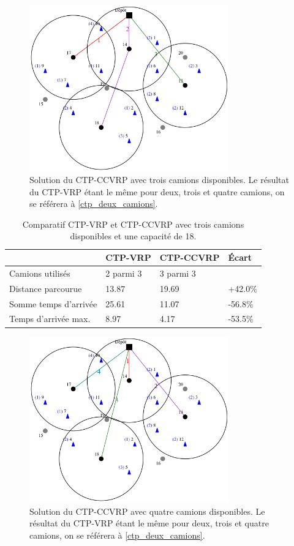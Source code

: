 \documentclass[5p,authoryear,square]{elsarticle}
\begin{document}
\begin{figure}[p] \centering
	\centerline{\includegraphics[width=3.4in]{figures/ctpccvrp_trois_camions}}
	\caption[]{Solution du CTP-CCVRP avec trois camions disponibles. Le résultat du CTP-VRP étant le même pour deux, trois et quatre camions, on se référera à \cref{ctp_deux_camions}.} \label{ctpccvrp_trois_camions}
\end{figure}


\begin{table}[p] \centering \begin{tabular}{@{\small}llll@{}} \toprule %
 & {\footnotesize CTP-VRP} &  {\footnotesize CTP-CCVRP} & Écart \\ \midrule
Camions utilisés & 2 parmi 3 & 3 parmi 3 &  \\
Distance parcourue & 13.87 & 19.69 & +42.0\% \\
Somme temps d'arrivée & 25.61 & 11.07 & -56.8\% \\
Temps d'arrivée max. & 8.97 & 4.17 & -53.5\% \\ \bottomrule
\end{tabular} \caption{Comparatif CTP-VRP et CTP-CCVRP avec trois camions disponibles et une capacité de 18.} \label{table_trois_camions}
\end{table}


\begin{figure}[p] \centering
	\centerline{\includegraphics[width=3.4in]{figures/ctpccvrp_quatre_camions}}
	\caption[]{Solution du CTP-CCVRP avec quatre camions disponibles. Le résultat du CTP-VRP étant le même pour deux, trois et quatre camions, on se référera à \cref{ctp_deux_camions}.} \label{ctpccvrp_trois_camions} \label{ctpccvrp_quatre_camions}
\end{figure}
\end{document}
